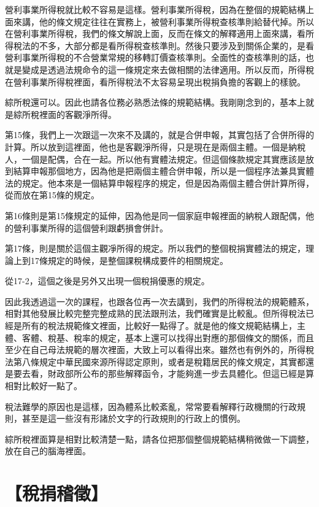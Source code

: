 \documentclass[oneside,sub3section]{ctexbook}
\begin{document}
營利事業所得稅就比較不容易是這樣。營利事業所得稅，因為在整個的規範結構上面來講，他的條文規定往往在實務上，被營利事業所得稅查核準則給替代掉。所以在營利事業所得稅，我們的條文解說上面，反而在條文的解釋適用上面來講，看所得稅法的不多，大部分都是看所得稅查核準則。然後只要涉及到關係企業的，是看營利事業所得稅的不合營業常規的移轉訂價查核準則。全面性的查核準則的話，也就是變成是透過法規命令的這一條規定來去做相關的法律適用。所以反而，所得稅在營利事業所得稅裡面，看所得稅法不太容易呈現出稅捐負擔的客觀上的樣貌。

綜所稅還可以。因此也請各位務必熟悉法條的規範結構。我剛剛念到的，基本上就是綜所稅裡面的客觀淨所得。

第15條，我們上一次跟這一次來不及講的，就是合併申報，其實包括了合併所得的計算。所以放到這裡面，他也是客觀淨所得，只是現在是兩個主體。一個是納稅人，一個是配偶，合在一起。所以他有實體法規定。但這個條款規定其實應該是放到結算申報那個地方，因為他是把兩個主體合併申報，所以是一個程序法兼具實體法的規定。他本來是一個結算申報程序的規定，但是因為兩個主體合併計算所得，從而放在第15條的規定。

第16條則是第15條規定的延伸，因為他是同一個家庭申報裡面的納稅人跟配偶，他的營利事業所得的這個營利跟虧損會併計。

第17條，則是關於這個主觀凈所得的規定。所以我們的整個稅捐實體法的規定，理論上到17條規定的時候，是整個課稅構成要件的相關規定。

從17-2，這個之後是另外又出現一個稅捐優惠的規定。

因此我透過這一次的課程，也跟各位再一次去講到，我們的所得稅法的規範體系，相對其他發展比較完整完整成熟的民法跟刑法，我們確實是比較亂。但所得稅法已經是所有的稅法規範條文裡面，比較好一點得了。就是他的條文規範結構上，主體、客體、稅基、稅率的規定，基本上還可以找得出對應的那個條文的關係，而且至少在自己母法規範的層次裡面，大致上可以看得出來。雖然也有例外的，所得稅法第八條規定中華民國來源所得認定原則，或者是稅籍居民的條文規定，其實都還是要去看，財政部所公布的那些解釋函令，才能夠進一步去具體化。但這已經是算相對比較好一點了。

稅法難學的原因也是這樣，因為體系比較紊亂，常常要看解釋行政機關的行政規則，甚至是這一些沒有形諸於文字的行政規則的行政上的慣例。

綜所稅裡面算是相對比較清楚一點，請各位把那個整個規範結構稍微做一下調整，放在自己的腦海裡面。

\hypertarget{ux7a05ux6350ux7a3dux5fb5}{%
\chapter{【稅捐稽徵】}\label{ux7a05ux6350ux7a3dux5fb5}}
\end{document}
